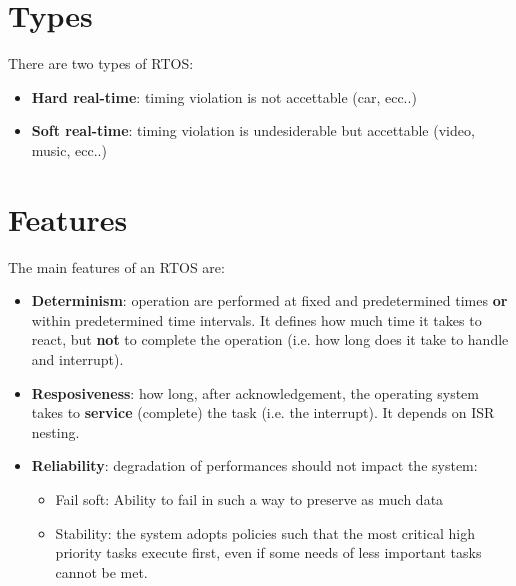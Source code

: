 \section{Types}
There are two types of RTOS:
\begin{itemize}
	\item \textbf{Hard real-time}: timing violation is not accettable (car, ecc..)
	\item \textbf{Soft real-time}: timing violation is undesiderable but accettable (video, music, ecc..)
\end{itemize}

\section{Features}
The main features of an RTOS are:
\begin{itemize}
	\item \textbf{Determinism}: operation are performed at fixed and predetermined times \textbf{or} within predetermined time intervals. It defines how much time it takes to react, but \textbf{not} to complete the operation (i.e. how long does it take to handle and interrupt).
	\item \textbf{Resposiveness}: how long, after acknowledgement, the operating system takes to \textbf{service} (complete) the task (i.e. the interrupt). It depends on ISR nesting.
	\item \textbf{Reliability}: degradation of performances should not impact the system:	
	\begin{itemize}
		\item Fail soft: Ability to fail in such a way to preserve as much data
		\item Stability: the system adopts policies such that the most critical high priority tasks execute first, even if some needs of less important tasks cannot be met.
	\end{itemize}
\end{itemize}

